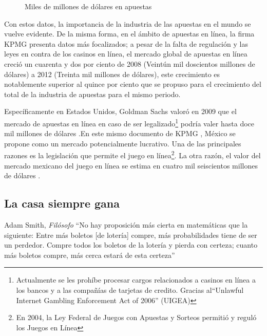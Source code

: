 \begin{figure}[!htb]\centering
   \begin {minipage}{0.85\textwidth}
     \caption{Miles de millones de dólares en apuestas}\label{Fig:gasto-apuestas}
   \end{minipage}
\end{figure}

Con estos datos, la importancia de la industria de las apuestas en el mundo se vuelve evidente. De la misma forma, en el ámbito de apuestas en línea, la firma KPMG \cite{kpmgOnlineGaming} presenta datos más focalizados; a pesar de la falta de regulación y las leyes en contra de los casinos en línea, el mercado global de apuestas en línea creció un cuarenta y dos por ciento de 2008 (Veintún mil doscientos millones de dólares) a 2012 (Treinta mil millones de dólares), este crecimiento es notablemente superior al quince por ciento que se propuso para el crecimiento del total de la industria de apuestas para el mismo periodo.

Específicamente en Estados Unidos, Goldman Sachs valoró en 2009 que el mercado de apuestas en línea en caso de ser legalizado\footnote{Actualmente se les prohíbe procesar cargos relacionados a casinos en línea a los bancos y a las compañías de tarjetas de credito. Gracias al``Unlawful Internet Gambling Enforcement Act of 2006'' (UIGEA)} podría valer hasta doce mil millones de dólares \cite{goldmanParty}.En este mismo documento de KPMG \cite{kpmgOnlineGaming}, México se propone como un mercado potencialmente lucrativo. Una de las principales razones es la legislación que permite el juego en línea\footnote{En 2004, la Ley Federal de Juegos con Apuestas y Sorteos permitió y reguló los Juegos en Línea}. La otra razón, el valor del mercado mexicano del juego en línea se estima en cuatro mil seiscientos millones de dólares \cite{yogonet}.

\subsection{La casa siempre gana}

\begin{chapquote}{Adam Smith, \textit{Filósofo}}
	``No hay proposición más cierta en matemáticas que la siguiente: Entre más boletos [de lotería] compre, más probabilidades tiene de ser un perdedor. Compre todos los boletos de la lotería y pierda con certeza; cuanto más boletos compre, más cerca estará de esta certeza''
\end{chapquote}

